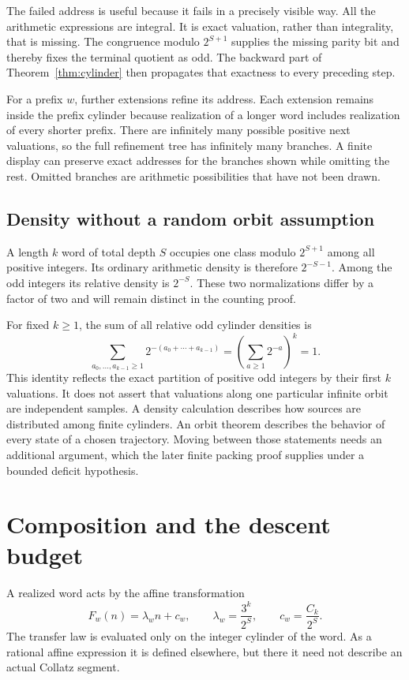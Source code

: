 The failed address is useful because it fails in a precisely visible way. All the arithmetic expressions are integral. It is exact valuation, rather than integrality, that is missing. The congruence modulo $2^{S+1}$ supplies the missing parity bit and thereby fixes the terminal quotient as odd. The backward part of Theorem~\ref{thm:cylinder} then propagates that exactness to every preceding step.

For a prefix $w$, further extensions refine its address. Each extension remains inside the prefix cylinder because realization of a longer word includes realization of every shorter prefix. There are infinitely many possible positive next valuations, so the full refinement tree has infinitely many branches. A finite display can preserve exact addresses for the branches shown while omitting the rest. Omitted branches are arithmetic possibilities that have not been drawn.

\subsection{Density without a random orbit assumption}
A length $k$ word of total depth $S$ occupies one class modulo $2^{S+1}$ among all positive integers. Its ordinary arithmetic density is therefore $2^{-S-1}$. Among the odd integers its relative density is $2^{-S}$. These two normalizations differ by a factor of two and will remain distinct in the counting proof.

For fixed $k\ge1$, the sum of all relative odd cylinder densities is
\[
\sum_{a_0,\ldots,a_{k-1}\ge1}2^{-(a_0+\cdots+a_{k-1})}
=\left(\sum_{a\ge1}2^{-a}\right)^k=1.
\]
This identity reflects the exact partition of positive odd integers by their first $k$ valuations. It does not assert that valuations along one particular infinite orbit are independent samples. A density calculation describes how sources are distributed among finite cylinders. An orbit theorem describes the behavior of every state of a chosen trajectory. Moving between those statements needs an additional argument, which the later finite packing proof supplies under a bounded deficit hypothesis.


\section{Composition and the descent budget}
A realized word acts by the affine transformation
\begin{equation}\label{eq:transfer}
F_w(n)=\lambda_w n+c_w,\qquad
\lambda_w=\frac{3^k}{2^S},\qquad c_w=\frac{C_k}{2^S}.
\end{equation}
The transfer law is evaluated only on the integer cylinder of the word. As a rational affine expression it is defined elsewhere, but there it need not describe an actual Collatz segment.

